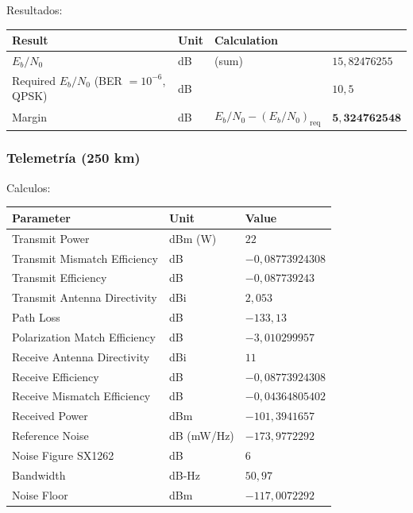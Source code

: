\documentclass[12pt,a4paper]{article}
\newcounter{none} %
\begin{document}
Resultados:

{\def\LTcaptype{none} %
\begin{longtable}[]{@{}
  >{\raggedright\arraybackslash}p{}
  >{\raggedright\arraybackslash}p{}
  >{\raggedright\arraybackslash}p{}
  >{\raggedleft\arraybackslash}p{}@{}}
\toprule\noalign{}
\textbf{Result} & \textbf{Unit} & \textbf{Calculation} & \\
\midrule\noalign{}
\endhead
\bottomrule\noalign{}
\endlastfoot
$E_b/N_0$ & dB & (sum) & $15{,}82476255$ \\
Required $E_b/N_0$ (BER $=10^{-6}$, QPSK) & dB & & $10{,}5$ \\
Margin & dB & $E_b/N_0 - (E_b/N_0)_{\text{req}}$ & \cellcolor{green!40}$\mathbf{5{,}324762548}$ \\
\end{longtable}
}

\subsubsection{Telemetría (250 km)}\label{link-budget-telemetria}

Calculos:
{\def\LTcaptype{none} %
\begin{longtable}[]{@{}
  >{\raggedright\arraybackslash}p{}
  >{\raggedright\arraybackslash}p{}
  >{\raggedleft\arraybackslash}p{}@{}}
\toprule\noalign{}
\textbf{Parameter} & \textbf{Unit} & \textbf{Value} \\
\midrule\noalign{}
\endhead
\bottomrule\noalign{}
\endlastfoot
Transmit Power & dBm (W) & $22$ \\
Transmit Mismatch Efficiency & dB & $-0{,}08773924308$ \\
Transmit Efficiency & dB & $-0{,}087739243$ \\
Transmit Antenna Directivity & dBi & $2{,}053$ \\
Path Loss & dB & $-133{,}13$ \\
Polarization Match Efficiency & dB & $-3{,}010299957$ \\
Receive Antenna Directivity & dBi & $11$ \\
Receive Efficiency & dB & $-0{,}08773924308$ \\
Receive Mismatch Efficiency & dB & $-0{,}04364805402$ \\
\midrule\noalign{}
Received Power & dBm & $-101{,}3941657$ \\
\midrule\noalign{}
Reference Noise & dB (mW/Hz) & $-173{,}9772292$ \\
Noise Figure SX1262 & dB & $6$ \\
Bandwidth & dB-Hz & $50{,}97$ \\
\midrule\noalign{}
Noise Floor & dBm & $-117{,}0072292$ \\
\end{longtable}
}\cite{ref108}\cite{ref109}
\end{document}
